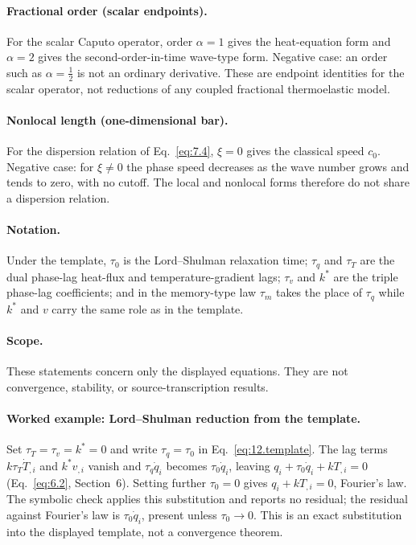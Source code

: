 \paragraph{Fractional order (scalar endpoints).} For the scalar Caputo operator, order $\alpha=1$ gives the heat-equation form and $\alpha=2$ gives the second-order-in-time wave-type form. Negative case: an order such as $\alpha=\tfrac12$ is not an ordinary derivative. These are endpoint identities for the scalar operator, not reductions of any coupled fractional thermoelastic model.

\paragraph{Nonlocal length (one-dimensional bar).} For the dispersion relation of Eq.~\eqref{eq:7.4}, $\xi=0$ gives the classical speed $c_0$. Negative case: for $\xi\neq0$ the phase speed decreases as the wave number grows and tends to zero, with no cutoff. The local and nonlocal forms therefore do not share a dispersion relation.

\paragraph{Notation.} Under the template, $\tau_0$ is the Lord--Shulman relaxation time; $\tau_q$ and $\tau_T$ are the dual phase-lag heat-flux and temperature-gradient lags; $\tau_v$ and $k^*$ are the triple phase-lag coefficients; and in the memory-type law $\tau_m$ takes the place of $\tau_q$ while $k^*$ and $v$ carry the same role as in the template.

\paragraph{Scope.} These statements concern only the displayed equations. They are not convergence, stability, or source-transcription results.

\paragraph{Worked example: Lord--Shulman reduction from the template.} Set $\tau_T=\tau_v=k^*=0$ and write $\tau_q=\tau_0$ in Eq.~\eqref{eq:12.template}. The lag terms $k\tau_T\dot T_{,i}$ and $k^*v_{,i}$ vanish and $\tau_q\dot q_i$ becomes $\tau_0\dot q_i$, leaving $q_i+\tau_0\dot q_i+kT_{,i}=0$ (Eq.~\eqref{eq:6.2}, Section~6). Setting further $\tau_0=0$ gives $q_i+kT_{,i}=0$, Fourier's law. The symbolic check applies this substitution and reports no residual; the residual against Fourier's law is $\tau_0\dot q_i$, present unless $\tau_0\to0$. This is an exact substitution into the displayed template, not a convergence theorem.



